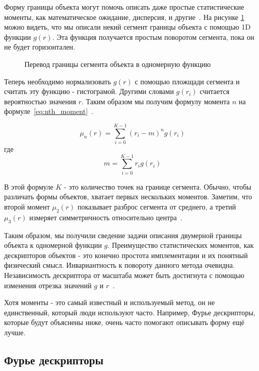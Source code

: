 Форму границы объекта могут помочь описать даже простые статистические моменты, как математическое ожидание, дисперсия, и другие~\cite{gonzalez2012digital}. На рисунке \ref{img:moments} можно видеть, что мы описали некий сегмент границы объекта с помощью 1D функции $g(r)$. Эта функция получается простым поворотом сегмента, пока он не будет горизонтален.

\begin{figure}[H]
	\centering
	
	\caption{Перевод границы сегмента объекта в одномерную функцию}
	\label{img:moments}
\end{figure}

Теперь необходимо нормализовать $g(r)$ с помощью пложщади сегмента и считать эту функцию - гистограмой. Другими словами $g(r_i)$ считается вероятностью значения $r$. Таким образом мы получим формулу момента $n$ на формуле~\eqref{eq:nth_moment}~\cite{gonzalez2012digital}.

\begin{equation}\label{eq:nth_moment}
\mu_n(r)=\sum_{i=0}^{K-1}(r_i - m)^n g(r_i)
\end{equation}
где
\begin{equation}\label{eq:mean}
m=\sum_{i=0}^{K-1}r_i g(r_i)
\end{equation}

В этой формуле $K$ - это количество точек на границе сегмента. Обычно, чтобы различать формы объектов, хватает первых нескольких моментов. Заметим, что второй момент $\mu_2(r)$ показывает разброс сегмента от среднего, а третий $\mu_3(r)$ измеряет симметричность относительно центра~\cite{gonzalez2012digital}.

Таким образом, мы получили сведение задачи описания двумерной границы объекта к одномерной функции $g$. Преимущество статистических моментов, как дескрипторов объектов - это конечно простота имплементации и их понятный физический смысл. Инвариантность к повороту данного метода очевидна. Независимость дескриптора от масштаба может быть достигнута с помощью изменения отрезка значений $g$ и $r$~\cite{gonzalez2012digital}.

Хотя моменты - это самый известный и используемый метод, он не единственный, который люди используют часто. Например, Фурье дескрипторы, которые будут объяснены ниже, очень часто помогают описывать форму ещё лучше. 

\subsection{Фурье дескрипторы}

